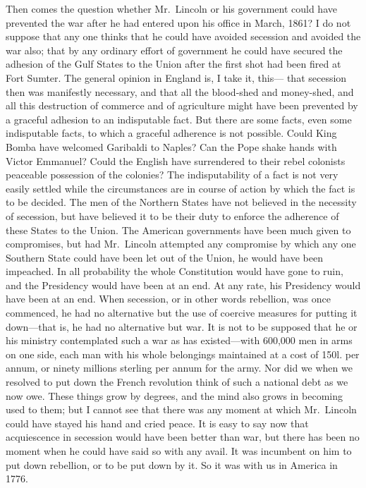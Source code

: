 Then comes the question whether Mr.\ Lincoln or his government could
have prevented the war after he had entered upon his office in
March, 1861?  I do not suppose that any one thinks that he could
have avoided secession and avoided the war also; that by any
ordinary effort of government he could have secured the adhesion of
the Gulf States to the Union after the first shot had been fired at
Fort Sumter.  The general opinion in England is, I take it, this---%
that secession then was manifestly necessary, and that all the
blood-shed and money-shed, and all this destruction of commerce and
of agriculture might have been prevented by a graceful adhesion to
an indisputable fact.  But there are some facts, even some
indisputable facts, to which a graceful adherence is not possible.
Could King Bomba have welcomed Garibaldi to Naples?  Can the Pope
shake hands with Victor Emmanuel?  Could the English have
surrendered to their rebel colonists peaceable possession of the
colonies?  The indisputability of a fact is not very easily settled
while the circumstances are in course of action by which the fact
is to be decided.  The men of the Northern States have not believed
in the necessity of secession, but have believed it to be their
duty to enforce the adherence of these States to the Union.  The
American governments have been much given to compromises, but had
Mr.\ Lincoln attempted any compromise by which any one Southern
State could have been let out of the Union, he would have been
impeached.  In all probability the whole Constitution would have
gone to ruin, and the Presidency would have been at an end.  At any
rate, his Presidency would have been at an end.  When secession, or
in other words rebellion, was once commenced, he had no alternative
but the use of coercive measures for putting it down---that is, he
had no alternative but war.  It is not to be supposed that he or
his ministry contemplated such a war as has existed---with 600,000
men in arms on one side, each man with his whole belongings
maintained at a cost of 150l. per annum, or ninety millions
sterling per annum for the army.  Nor did we when we resolved to
put down the French revolution think of such a national debt as we
now owe.  These things grow by degrees, and the mind also grows in
becoming used to them; but I cannot see that there was any moment
at which Mr.\ Lincoln could have stayed his hand and cried peace.
It is easy to say now that acquiescence in secession would have
been better than war, but there has been no moment when he could
have said so with any avail.  It was incumbent on him to put down
rebellion, or to be put down by it.  So it was with us in America
in 1776.


